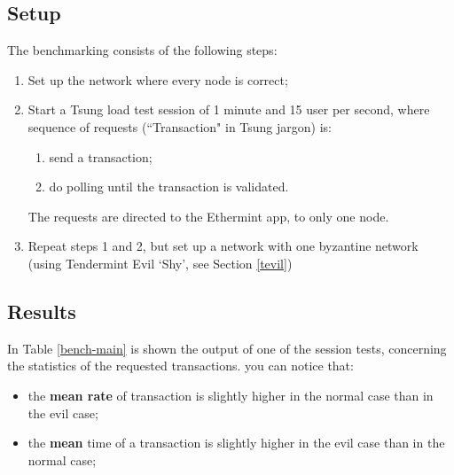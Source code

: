 \documentclass[]{article}
\begin{document}
\subsection{Setup}
The benchmarking consists of the following steps:
\begin{enumerate}
	\item Set up the network where every node is correct;
	\item Start a Tsung load test session of 1 minute and 15 user per second, where sequence of requests (``Transaction" in Tsung jargon) is:
	\begin{enumerate}
		\item send a transaction;
		\item do polling until the transaction is validated.
	\end{enumerate} 
	The requests are directed to the Ethermint app, to only one node.
	\item Repeat steps 1 and 2, but set up a network with one byzantine network (using Tendermint Evil `Shy', see Section \ref{tevil})
\end{enumerate}

\subsection{Results}

In Table \ref{bench-main} is shown the output of one of the session tests,  concerning the statistics of the requested transactions. you can notice that:
\begin{itemize}
	\item the \textbf{mean rate} of transaction is slightly higher in the normal case than in the evil case;
	\item the \textbf{mean} time of a transaction is slightly higher in the evil case than in the normal case;
\end{itemize}
\end{document}
